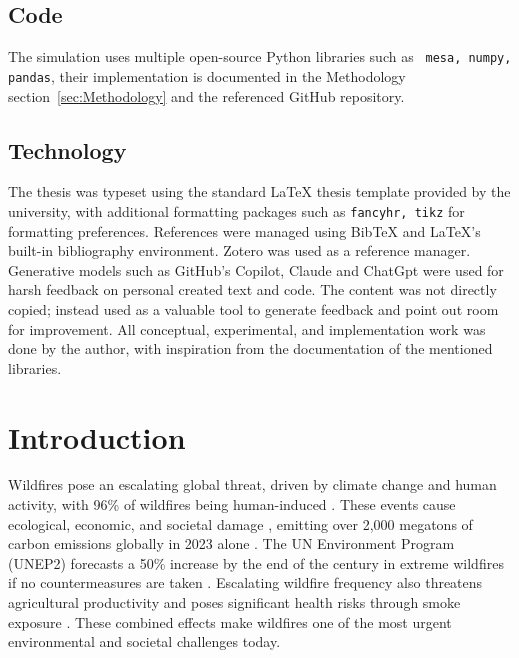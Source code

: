 \documentclass[twoside]{article}
\begin{document}
\subsection{Code}

The simulation uses multiple open-source Python libraries such as \texttt{ mesa, numpy, pandas}, their implementation is documented in the Methodology section~\ref{sec:Methodology} and the referenced GitHub repository.

\subsection{Technology}

The thesis was typeset using the standard LaTeX thesis template provided by the university, with additional formatting packages such as \texttt{fancyhr, tikz} for formatting preferences. References were managed using BibTeX and LaTeX’s built-in bibliography environment. Zotero was used as a reference manager.
Generative models such as GitHub's Copilot, Claude and ChatGpt were used for harsh feedback on personal created text and code. The content was not directly copied; instead used as a valuable tool to generate feedback and point out room for improvement. All conceptual, experimental, and implementation work was done by the author, with inspiration from the documentation of the mentioned libraries.


\section{Introduction}
\label{sec:Introduction}


Wildfires pose an escalating global threat, driven by climate change and human activity, with 96\% of wildfires being human-induced \citep{HybridAntColonyWildfire}. These events cause ecological, economic, and societal damage \citep{Saffre2022}, emitting over 2,000 megatons of carbon emissions globally in 2023 alone \citep{Lelis2024}. The UN Environment Program (UNEP2) forecasts a 50\% increase by the end of the century in extreme wildfires if no countermeasures are taken \citep{Sullivan2022}. Escalating wildfire frequency also threatens agricultural productivity \citep{IPCC2023} and poses significant health risks through smoke exposure \citep{Finlay2012}. These combined effects make wildfires one of the most urgent environmental and societal challenges today.
\end{document}
